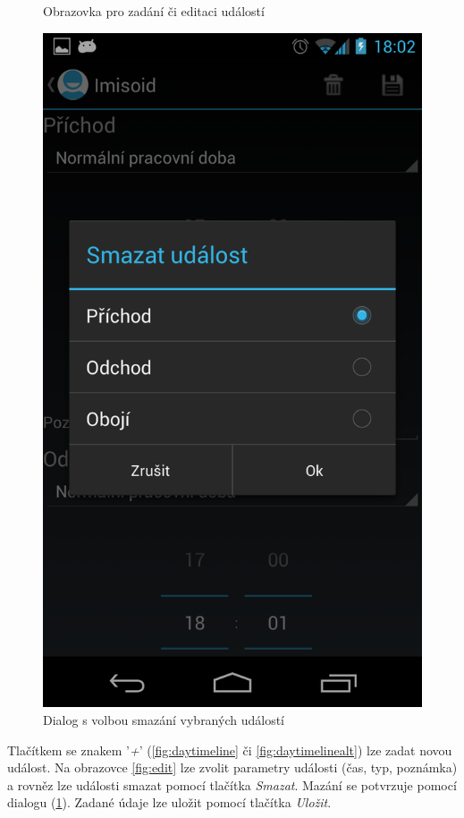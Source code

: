 \documentclass{diplomka}
\begin{document}
\begin{figure}[H]
\begin{minipage}{.45\textwidth}
 \caption{Obrazovka pro zadání či editaci událostí}
  \label{fig:edit}
\end{minipage}\hfill%
\begin{minipage}{.45\textwidth}
   \centering
 \includegraphics[width=.9\linewidth]{scr/delete.png}
 \caption{Dialog s volbou smazání vybraných událostí}
  \label{fig:delete}
\end{minipage}
\end{figure}
Tlačítkem se znakem '\emph{+}' (\ref{fig:daytimeline} či \ref{fig:daytimelinealt}) lze zadat novou událost. Na obrazovce \ref{fig:edit} lze zvolit parametry události (čas, typ, poznámka) a rovněz lze události smazat pomocí tlačítka \emph{Smazat}. Mazání se potvrzuje pomocí dialogu (\ref{fig:delete}). Zadané údaje lze uložit pomocí tlačítka \emph{Uložit}. 
\end{document}
